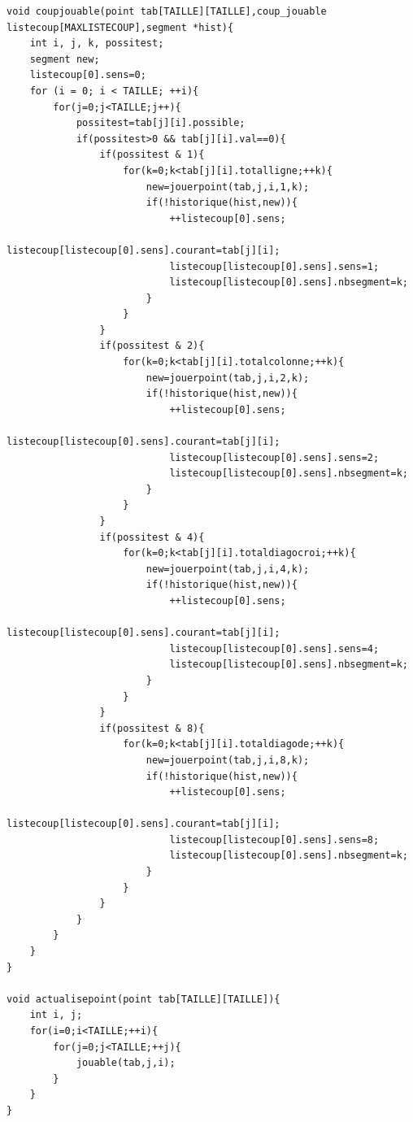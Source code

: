\documentclass[11pt]{article}
\begin{document}
\begin{verbatim}
void coupjouable(point tab[TAILLE][TAILLE],coup_jouable
listecoup[MAXLISTECOUP],segment *hist){
	int i, j, k, possitest;
	segment new;
	listecoup[0].sens=0;
	for (i = 0; i < TAILLE; ++i){
		for(j=0;j<TAILLE;j++){
			possitest=tab[j][i].possible;
			if(possitest>0 && tab[j][i].val==0){
				if(possitest & 1){
					for(k=0;k<tab[j][i].totalligne;++k){
						new=jouerpoint(tab,j,i,1,k);
						if(!historique(hist,new)){
							++listecoup[0].sens;
							listecoup[listecoup[0].sens].courant=tab[j][i];
							listecoup[listecoup[0].sens].sens=1;
							listecoup[listecoup[0].sens].nbsegment=k;
						}
					}
				}
				if(possitest & 2){
					for(k=0;k<tab[j][i].totalcolonne;++k){
						new=jouerpoint(tab,j,i,2,k);
						if(!historique(hist,new)){
							++listecoup[0].sens;
							listecoup[listecoup[0].sens].courant=tab[j][i];
							listecoup[listecoup[0].sens].sens=2;
							listecoup[listecoup[0].sens].nbsegment=k;
						}
					}
				}
				if(possitest & 4){
					for(k=0;k<tab[j][i].totaldiagocroi;++k){
						new=jouerpoint(tab,j,i,4,k);
						if(!historique(hist,new)){
							++listecoup[0].sens;
							listecoup[listecoup[0].sens].courant=tab[j][i];
							listecoup[listecoup[0].sens].sens=4;
							listecoup[listecoup[0].sens].nbsegment=k;
						}
					}
				}
				if(possitest & 8){
					for(k=0;k<tab[j][i].totaldiagode;++k){
						new=jouerpoint(tab,j,i,8,k);
						if(!historique(hist,new)){
							++listecoup[0].sens;
							listecoup[listecoup[0].sens].courant=tab[j][i];
							listecoup[listecoup[0].sens].sens=8;
							listecoup[listecoup[0].sens].nbsegment=k;
						}
					}
				}
			}
		}
	}
}

void actualisepoint(point tab[TAILLE][TAILLE]){
	int i, j;
	for(i=0;i<TAILLE;++i){
		for(j=0;j<TAILLE;++j){
			jouable(tab,j,i);
		}
	}
}
\end{verbatim}
\end{document}
